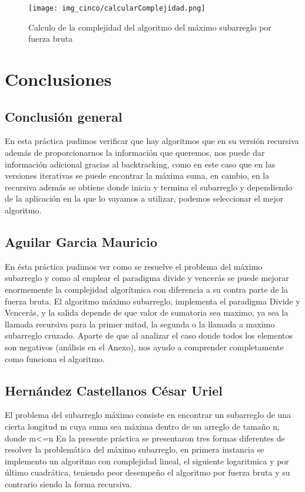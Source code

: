 \documentclass[12pt,twoside]{article}
\begin{document}
\begin{figure}[H]
\centering
\texttt{[image: img\_cinco/calcularComplejidad.png]}
\caption{Calculo de la complejidad del algoritmo del máximo subarreglo por fuerza bruta}
\end{figure}

\section{Conclusiones}
\vspace{10 mm}
\subsection*{Conclusión general}
	En esta pr\'{a}ctica pudimos verificar que hay algoritmos que en su versión recursiva además de proporcionarnos la información que queremos, nos puede dar información adicional gracias al backtracking, como en este caso que en las versiones iterativas se puede encontrar la máxima suma, en cambio, en la recursiva además se obtiene donde inicia y  termina el subarreglo y dependiendo de la aplicación en la que lo vayamos a utilizar, podemos seleccionar el mejor algoritmo. 
\subsection*{Aguilar Garcia Mauricio}
	En ésta práctica pudimos ver como se resuelve el problema del máximo subarreglo y como al emplear el paradigma divide y vencerás se puede mejorar enormemente la complejidad algorítmica con diferencia a su contra parte de la fuerza bruta. 
    El algoritmo máximo subarreglo, implementa el paradigma Divide y Vencerás, y la salida
depende de que valor de sumatoria sea maximo, ya sea la llamada recursiva para la primer mitad, la segunda o la llamada a maximo subarreglo cruzado. Aparte de que al analizar el
caso donde todos los elementos son negativos (análisis en el Anexo), nos ayudo a comprender
completamente como funciona el algoritmo.
\subsection*{Hernández Castellanos César Uriel}
El problema del subarreglo máximo consiste en encontrar un subarreglo de una cierta longitud m cuya suma sea máxima dentro de un arreglo de tamaño n, donde m<=n
\newline
\newline
En la presente práctica se presentaron tres formas diferentes de resolver la problemática del máximo subarreglo, en primera instancia se implemento un algoritmo con complejidad lineal, el siguiente logaritmica y por último cuadrática, teniendo peor desempeño el algoritmo por fuerza bruta y su contrario siendo la forma recursiva.
\end{document}
